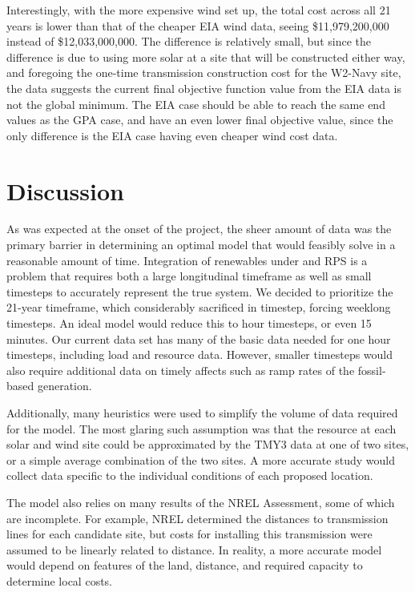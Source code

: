 \documentclass[12pt,letterpaper,fleqn]{report}
\begin{document}
Interestingly, with the more expensive wind set up, the total cost
across all 21 years is lower than that of the cheaper EIA wind data,
seeing \$11,979,200,000 instead of \$12,033,000,000. The difference is
relatively small, but since the difference is due to using more solar
at a site that will be constructed either way, and foregoing the
one-time transmission construction cost for the W2-Navy site, the data
suggests the current final objective function value from the EIA data
is not the global minimum. The EIA case should be able to reach the
same end values as the GPA case, and have an even lower final
objective value, since the only difference is the EIA case having even
cheaper wind cost data.

\section{Discussion}

As was expected at the onset of the project, the sheer amount of data
was the primary barrier in determining an optimal model that would
feasibly solve in a reasonable amount of time. Integration of
renewables under and RPS is a problem that requires both a large
longitudinal timeframe as well as small timesteps to accurately
represent the true system. We decided to prioritize the 21-year
timeframe, which considerably sacrificed in timestep, forcing weeklong
timesteps. An ideal model would reduce this to hour timesteps, or even
15 minutes. Our current data set has many of the basic data needed for
one hour timesteps, including load and resource data. However, smaller
timesteps would also require additional data on timely affects such as
ramp rates of the fossil-based generation. 

Additionally, many heuristics were used to simplify the volume of data
required for the model. The most glaring such assumption was that the
resource at each solar and wind site could be approximated by the TMY3
data at one of two sites, or a simple average combination of the two
sites. A more accurate study would collect data specific to the
individual conditions of each proposed location.

The model also relies on many results of the NREL Assessment, some of
which are incomplete. For example, NREL determined the distances to
transmission lines for each candidate site, but costs for installing
this transmission were assumed to be linearly related to distance. In
reality, a more accurate model would depend on features of the land,
distance, and required capacity to determine local costs.
\end{document}
